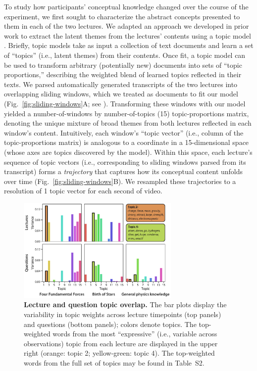 \documentclass[10pt]{article}
\newcommand{\topics}{S2}
\renewcommand{\nameref}[1]{\mbox{\textit{\oldnameref{#1}}}}
\begin{document}
To study how participants' conceptual knowledge changed over the course of the
experiment, we first sought to characterize the abstract concepts presented to
them in each of the two lectures. We adapted an approach we developed in prior
work \citep{HeusEtal21} to extract the latent themes from the lectures' contents
using a topic model \citep{BleiEtal03}. Briefly, topic models take as input a
collection of text documents and learn a set of ``topics'' (i.e., latent
themes) from their contents. Once fit, a topic model can be used to transform
arbitrary (potentially new) documents into sets of ``topic proportions,''
describing the weighted blend of learned topics reflected in their texts. We
parsed automatically generated transcripts of the two lectures into
overlapping sliding windows, which we treated as documents to fit our model
(Fig.~\ref{fig:sliding-windows}A; see \nameref{subsec:topic-modeling}).
Transforming these windows with our model yielded a number-of-windows by
number-of-topics (15) topic-proportions matrix, denoting the unique mixture
of broad themes from both lectures reflected in each window's content.
Intuitively, each window's ``topic vector'' (i.e., column of the
topic-proportions matrix) is analogous to a coordinate in a 15-dimensional
space (whose axes are topics discovered by the model). Within this space, each lecture's sequence of
topic vectors (i.e., corresponding to sliding windows parsed from its
transcript) forms a \textit{trajectory} that captures how its conceptual
content unfolds over time (Fig.~\ref{fig:sliding-windows}B). We resampled
these trajectories to a resolution of 1 topic vector for each second of video.

\begin{figure}[tp]
    \centering
    \includegraphics[width=0.7\textwidth]{figs/active-topics}

\caption{\textbf{Lecture and question topic overlap.} The bar plots display the
variability in topic weights across lecture timepoints (top panels) and
questions (bottom panels); colors denote topics. The top-weighted words from
the most ``expressive'' (i.e., variable across observations) topic from each
lecture are displayed in the upper right (orange: topic 2; yellow-green: topic
4). The top-weighted words from the full set of topics may be found in
Table~\topics.}

    \label{fig:topics}
\end{figure}
\end{document}
